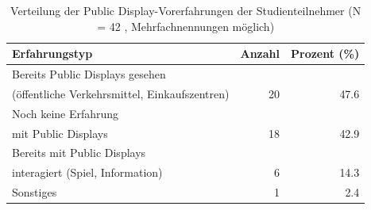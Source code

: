 \begin{table}[htbp]
\centering
\caption{Verteilung der Public Display-Vorerfahrungen der Studienteilnehmer (N = 42 , Mehrfachnennungen möglich)} 
\label{tab:pd_experience}
\begin{tabular}{lrr}
  \toprule
Erfahrungstyp & Anzahl & Prozent (\%) \\ 
  \midrule
Bereits Public Displays gesehen\\(öffentliche Verkehrsmittel, Einkaufszentren) & 20 & 47.6 \\ 
  Noch keine Erfahrung\\mit Public Displays & 18 & 42.9 \\ 
  Bereits mit Public Displays\\interagiert (Spiel, Information) & 6 & 14.3 \\ 
  Sonstiges & 1 & 2.4 \\ 
   \bottomrule
\end{tabular}
\end{table}